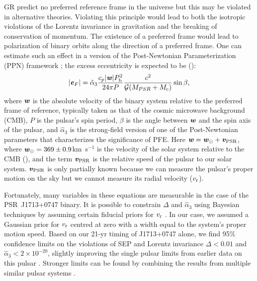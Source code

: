 GR predict no preferred reference frame in the universe but this may
be violated in alternative theories. 
Violating this principle would lead to both the isotropic violations of the
Lorentz invariance in gravitation and the breaking of conservation of momentum.
The existence of  
a preferred frame would lead to polarization of binary orbits along the
direction of a preferred frame.
One can estimate such an effect in a version of the Post-Newtonian Parameterization
(PPN) framework \cite{de92}; the excess eccentricity is expected to be (\citealt{bd96}):
\begin{equation}
|\textbf{\textit{e}}_F| = \hat{\alpha}_3 \frac{c_p|\textbf{\textit{w}}|P_{\rm b}^2}{24\pi P}
\frac{c^2}{\msG (M_{PSR}+M_{\rm c})}\sin \beta,
\end{equation}
where $\textbf{\textit{w}}$ is the absolute velocity of the binary system
relative to the preferred frame of reference, typically taken as that of the cosmic microwave background (CMB), $P$ is the pulsar's spin period, $\beta$ is the
angle between $\textbf{\textit{w}}$ and the spin axis of the pulsar, and
$\hat{\alpha}_3$ is the strong-field version of one of the Post-Newtonian
parameters that characterizes the significance of PFE.
Here $\textbf{\textit{w}} = \textbf{\textit{w}}_{\odot} + \textbf{\textit{v}}_{\rm PSR}$, where
$\textbf{\textit{w}}_{\odot}=369\pm0.9$km~s$^{-1}$ is the velocity of
the solar system relative to the CMB (\citealt{hwh+09}),
and the term $\textbf{\textit{v}}_{\rm PSR}$ is the relative speed of the pulsar to our solar system. 
$\textbf{\textit{v}}_{\rm PSR}$ is only partially known because we can measure the pulsar's
proper motion on the sky but we cannot measure its radial velocity ($v_{\rm r}$).

Fortunately, many variables in these equations are measurable in the
case of the PSR~J1713+0747 binary. 
It is possible to constrain $\Delta$ and $\hat{\alpha}_3$ using Bayesian techniques 
by assuming certain fiducial priors for $v_{\rm r}$ \citep{sns+05, sfl+05, gsf+11}. 
In our case, we assumed a Gaussian prior for $v_{\rm r}$ centred at zero with
a width equal to the system's proper motion speed.
Based on our 21-yr 
timing of J1713+0747 alone, we find 95\% confidence limits on the violations of SEP and
Lorentz invariance $\Delta < 0.01$ and $\hat{\alpha}_3<2\times10^{-20}$, 
slightly improving the single pulsar limits from earlier data on this pulsar
\citep{sns+05, sfl+05, gsf+11}.
Stronger limits can be found by combining the results from
multiple similar pulsar systems \citep{wex00,sfl+05, gsf+11}.


